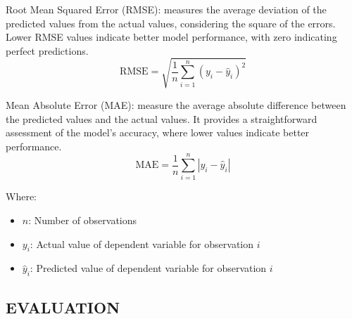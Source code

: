\documentclass[conference]{IEEEtran}
\begin{document}
Root Mean Squared Error (RMSE): measures the average deviation of the predicted values from the actual values, considering the square of the errors. Lower RMSE values indicate better model performance, with zero indicating perfect predictions.
\[\text{RMSE} = \sqrt{\frac{1}{n} \sum_{i=1}^{n} (y_i - \hat{y}_i)^2}\]

Mean Absolute Error (MAE): measure the average absolute difference between the predicted values and the actual values. It provides a straightforward assessment of the model's accuracy, where lower values indicate better performance.
\[\text{MAE} = \frac{1}{n} \sum_{i=1}^{n} |y_i - \hat{y}_i|\]

Where:
\begin{itemize}
    \item \(n\): Number of observations
    \item \(y_i\): Actual value of dependent variable for observation \(i\)
    \item \(\hat{y}_i\): Predicted value of dependent variable for observation \(i\)
\end{itemize}


\subsection{EVALUATION}
\end{document}
